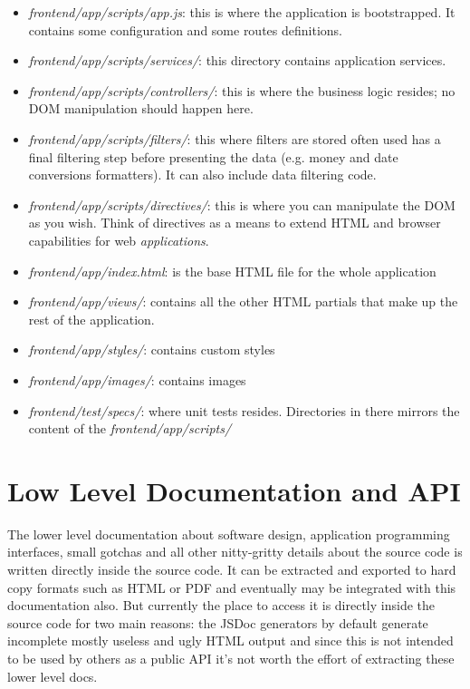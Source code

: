 \documentclass[letterpaper,10pt,english]{sphinxmanual}
\begin{document}
\begin{itemize}
\item {} 
\emph{frontend/app/scripts/app.js}: this is where the application is
bootstrapped. It contains some configuration and some routes
definitions.

\item {} 
\emph{frontend/app/scripts/services/}: this directory contains
application services.

\item {} 
\emph{frontend/app/scripts/controllers/}: this is where the business
logic resides; no DOM manipulation should happen here.

\item {} 
\emph{frontend/app/scripts/filters/}: this where filters are stored often
used has a final filtering step before presenting the data
(e.g. money and date conversions formatters). It can also include
data filtering code.

\item {} 
\emph{frontend/app/scripts/directives/}: this is where you can manipulate
the DOM as you wish. Think of directives as a means to extend HTML
and browser capabilities for web \emph{applications}.

\item {} 
\emph{frontend/app/index.html}: is the base HTML file for the whole
application

\item {} 
\emph{frontend/app/views/}: contains all the other HTML partials that
make up the rest of the application.

\item {} 
\emph{frontend/app/styles/}: contains custom styles

\item {} 
\emph{frontend/app/images/}: contains images

\item {} 
\emph{frontend/test/specs/}: where unit tests resides. Directories in there
mirrors the content of the \emph{frontend/app/scripts/}

\end{itemize}


\section{Low Level Documentation and API}
\label{developer-guide:low-level-documentation-and-api}
The lower level documentation about software design, application
programming interfaces, small gotchas and all other nitty-gritty
details about the source code is written directly inside the source
code. It can be extracted and exported to hard copy formats such as
HTML or PDF and eventually may be integrated with this documentation
also. But currently the place to access it is directly inside the
source code for two main reasons: the JSDoc generators by default
generate incomplete mostly useless and ugly HTML output and since this
is not intended to be used by others as a public API it's not worth
the effort of extracting these lower level docs.
\end{document}
